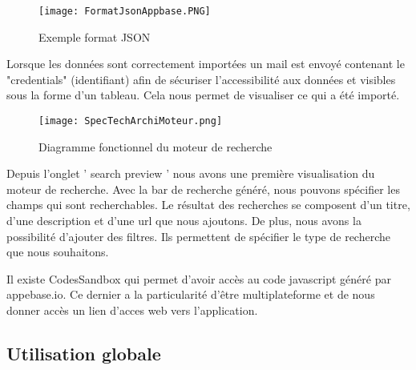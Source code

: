 \begin{figure}[h!]
  \centering
	\texttt{[image: FormatJsonAppbase.PNG]}
	\caption[]{Exemple format JSON}
  \label{}
\end{figure}

Lorsque les données sont correctement importées un mail est envoyé contenant le "credentials" (identifiant) afin de sécuriser l'accessibilité aux données et visibles sous la forme d'un tableau. Cela nous permet de visualiser ce qui a été importé. 

\begin{figure}[h!]
  \centering
	\texttt{[image: SpecTechArchiMoteur.png]}
	\caption[]{Diagramme fonctionnel du moteur de recherche}
  \label{}
\end{figure}

Depuis l’onglet ' search preview ' nous avons une première visualisation du moteur de recherche. Avec la bar de recherche généré, nous pouvons spécifier les champs qui sont recherchables. 
Le résultat des recherches se composent d’un titre, d’une description et d’une url que nous ajoutons. De plus, nous avons la possibilité d’ajouter des filtres. Ils permettent de spécifier le type de recherche que nous souhaitons.

Il existe CodesSandbox qui permet d’avoir accès au code javascript généré par appebase.io. Ce dernier a la particularité d’être multiplateforme et de nous donner accès un lien d’acces web vers l’application.


\subsection {Utilisation globale}

